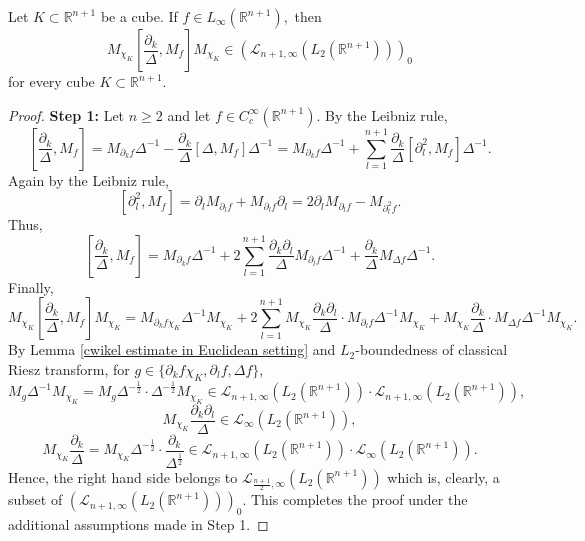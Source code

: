 \documentclass[12pt]{amsart}
\begin{document}
\begin{lemma}\label{mtb separable part lemma} Let $K\subset\mathbb{R}^{n+1}$ be a cube. If $f\in L_{\infty}(\mathbb{R}^{n+1}),$ then
$$M_{\chi_K}[\frac{\partial_k}{\Delta},M_f]M_{\chi_K}\in (\mathcal{L}_{n+1,\infty}(L_2(\mathbb{R}^{n+1})))_0$$
for every cube $K\subset\mathbb{R}^{n+1}.$
\end{lemma}
\begin{proof} {\bf Step 1:} Let $n\geq 2$ and let $f\in C^{\infty}_c(\mathbb{R}^{n+1}).$ By the Leibniz rule,
$$[\frac{\partial_k}{\Delta},M_f]=M_{\partial_kf}\Delta^{-1}-\frac{\partial_k}{\Delta}[\Delta,M_f]\Delta^{-1}=M_{\partial_kf}\Delta^{-1}+\sum_{l=1}^{n+1}\frac{\partial_k}{\Delta}[\partial_l^2,M_f]\Delta^{-1}.$$
Again by the Leibniz rule,
$$[\partial_l^2,M_f]=\partial_lM_{\partial_lf}+M_{\partial_lf}\partial_l=2\partial_lM_{\partial_lf}-M_{\partial_l^2f}.$$
Thus,
$$[\frac{\partial_k}{\Delta},M_f]=M_{\partial_kf}\Delta^{-1}+2\sum_{l=1}^{n+1}\frac{\partial_k\partial_l}{\Delta}M_{\partial_lf}\Delta^{-1}+\frac{\partial_k}{\Delta}M_{\Delta f}\Delta^{-1}.$$
Finally,
$$M_{\chi_K}[\frac{\partial_k}{\Delta},M_f]M_{\chi_K}=M_{\partial_kf\chi_K}\Delta^{-1}M_{\chi_K}+2\sum_{l=1}^{n+1}M_{\chi_K}\frac{\partial_k\partial_l}{\Delta}\cdot M_{\partial_lf}\Delta^{-1}M_{\chi_K}+M_{\chi_K}\frac{\partial_k}{\Delta}\cdot M_{\Delta f}\Delta^{-1}M_{\chi_K}.$$
By Lemma \ref{cwikel estimate in Euclidean setting} and $L_2$-boundedness of classical Riesz transform, for $g\in \{\partial_kf\chi_K,\partial_lf,\Delta f\}$,
$$M_{g}\Delta^{-1}M_{\chi_K}=M_{g}\Delta^{-\frac12}\cdot\Delta^{-\frac12}M_{\chi_K}\in \mathcal{L}_{n+1,\infty}(L_2(\mathbb{R}^{n+1}))\cdot \mathcal{L}_{n+1,\infty}(L_2(\mathbb{R}^{n+1})),$$
$$M_{\chi_K}\frac{\partial_k\partial_l}{\Delta}\in \mathcal{L}_{\infty}(L_2(\mathbb{R}^{n+1})),$$
$$M_{\chi_K}\frac{\partial_k}{\Delta}=M_{\chi_K}\Delta^{-\frac12}\cdot\frac{\partial_k}{\Delta^{\frac12}}\in \mathcal{L}_{n+1,\infty}(L_2(\mathbb{R}^{n+1}))\cdot \mathcal{L}_{\infty}(L_2(\mathbb{R}^{n+1})).$$
Hence, the right hand side belongs to $\mathcal{L}_{\frac{n+1}{2},\infty}(L_2(\mathbb{R}^{n+1}))$ which is, clearly, a subset of $(\mathcal{L}_{n+1,\infty}(L_2(\mathbb{R}^{n+1})))_0.$ This completes the proof under the additional assumptions made in Step 1.
	


\end{proof}
\end{document}
